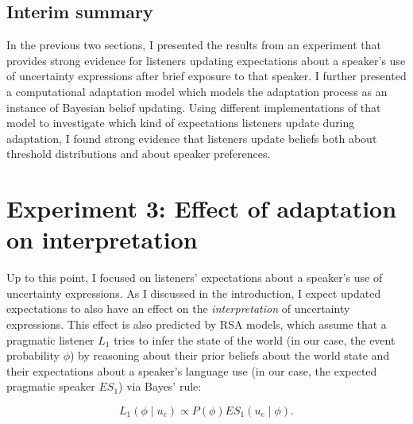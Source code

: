 \subsection{Interim summary}

In the previous two sections, I presented the results from an experiment that provides strong evidence for
listeners updating expectations about a speaker's use of uncertainty expressions after brief
exposure to that speaker. I further presented a computational adaptation model which models the adaptation
process as an instance of Bayesian belief updating. Using different implementations
of that model to investigate which kind of expectations listeners update during adaptation, I 
found strong evidence that listeners update beliefs both about  threshold distributions and 
 about speaker preferences.

\section{Experiment 3: Effect of adaptation on interpretation}
\label{sec:exp-model-interpretation}


Up to this point, I focused on listeners' expectations about a speaker's use of uncertainty expressions. As I discussed
in the introduction, I expect updated expectations to also have an effect on the \emph{interpretation} of uncertainty expressions. This
effect is also predicted by RSA models,  which assume that a pragmatic listener $L_1$ tries to infer the state of the world (in our case, the event probability $\phi$) by reasoning
about their prior beliefs about the world state and their expectations about a speaker's language use (in our case, the expected pragmatic speaker $ES_{1}$) via Bayes' rule:

$$ L_1(\phi \mid u_e) \propto P(\phi) ES_1(u_e \mid \phi).$$

